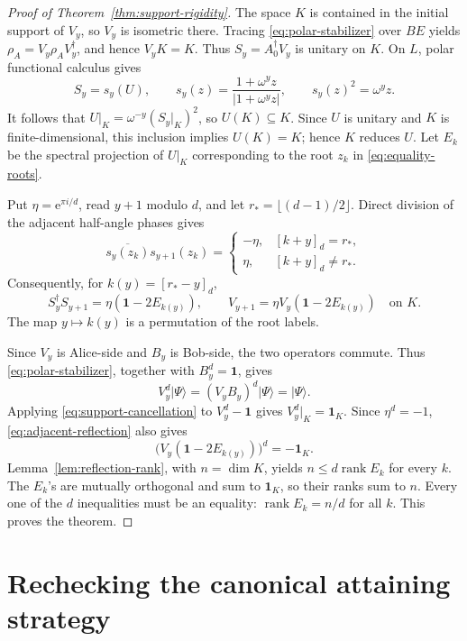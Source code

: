 \documentclass[11pt]{article}
\theoremstyle{definition}
\theoremstyle{remark}
\newcommand{\Id}{\mathbf 1}
\newcommand{\rankop}{\operatorname{rank}}
\newcommand{\e}{\mathrm e}
\newcommand{\absop}[1]{\lvert #1\rvert}
\begin{document}
\begin{proof}[Proof of Theorem~\ref{thm:support-rigidity}]
The space \(K\) is contained in the initial support of \(V_y\), so \(V_y\)
is isometric there.  Tracing \eqref{eq:polar-stabilizer} over \(BE\) yields
\(\rho_A=V_y\rho_AV_y^\dagger\), and hence \(V_yK=K\).  Thus
\(S_y=A_0^\dagger V_y\) is unitary on \(K\).  On \(L\), polar functional
calculus gives
\[
 S_y=s_y(U),
 \qquad
 s_y(z)=\frac{1+\omega^yz}{\absop{1+\omega^yz}},
 \qquad s_y(z)^2=\omega^yz.
\]
It follows that \(U|_K=\omega^{-y}(S_y|_K)^2\), so \(U(K)\subseteq K\).
Since \(U\) is unitary and \(K\) is finite-dimensional, this inclusion
implies \(U(K)=K\); hence \(K\) reduces \(U\).
Let \(E_k\) be the spectral projection of \(U|_K\) corresponding to the
root \(z_k\) in \eqref{eq:equality-roots}.

Put \(\eta=\e^{\pi i/d}\), read \(y+1\) modulo \(d\), and let
\(r_*=\lfloor(d-1)/2\rfloor\).  Direct division of the adjacent half-angle
phases gives
\[
 \overline{s_y(z_k)}s_{y+1}(z_k)
 =\begin{cases}
 -\eta,&[k+y]_d=r_*,\\
 \eta,&[k+y]_d\neq r_*.
 \end{cases}
\]
Consequently, for \(k(y)=[r_*-y]_d\),
\begin{equation}
 S_y^\dagger S_{y+1}=\eta(\Id-2E_{k(y)}),
 \qquad
 V_{y+1}=\eta V_y(\Id-2E_{k(y)})
 \quad\text{on }K.
 \label{eq:adjacent-reflection}
\end{equation}
The map \(y\mapsto k(y)\) is a permutation of the root labels.

Since \(V_y\) is Alice-side and \(B_y\) is Bob-side, the two operators
commute.  Thus \eqref{eq:polar-stabilizer}, together with \(B_y^d=\Id\),
gives
\[
 V_y^d\lvert\Psi\rangle
 =(V_yB_y)^d\lvert\Psi\rangle
 =\lvert\Psi\rangle.
\]
Applying \eqref{eq:support-cancellation} to \(V_y^d-\Id\) gives
\(V_y^d|_K=\Id_K\).  Since \(\eta^d=-1\),
\eqref{eq:adjacent-reflection} also gives
\[
 \bigl(V_y(\Id-2E_{k(y)})\bigr)^d=-\Id_K.
\]
Lemma~\ref{lem:reflection-rank}, with \(n=\dim K\), yields
\(n\leq d\rankop E_k\) for every \(k\).  The \(E_k\)'s are mutually
orthogonal and sum to \(\Id_K\), so their ranks sum to \(n\).  Every one of
the \(d\) inequalities must be an equality:
\(\rankop E_k=n/d\) for all \(k\).  This proves the theorem.
\end{proof}

\section{Rechecking the canonical attaining strategy}
\label{app:attainment}
\end{document}
